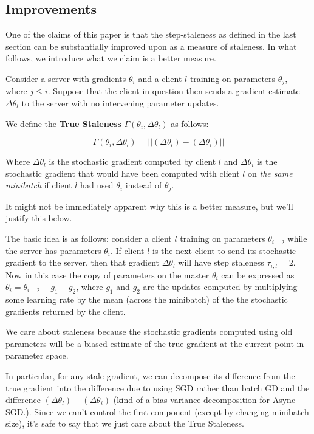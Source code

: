 \documentclass{article} %
\begin{document}
\subsection{Improvements}

One of the claims of this paper is that the step-staleness as defined in the last section
can be substantially improved upon as a measure of staleness.
In what follows, we introduce what we claim is a better measure. 

Consider a server with gradients $\theta_{i}$ and a client $l$ training on parameters $\theta_{j}$,
where $j \leq i$. Suppose that the client in question then sends a gradient estimate $\Delta \theta_l$
to the server with no intervening parameter updates.

We define the \textbf{True Staleness} $\Gamma(\theta_{i}, \Delta \theta_l)$ as follows:

$$ \Gamma(\theta_{i}, \Delta \theta_l) = || (\Delta \theta_l) - (\Delta \theta_i) || $$

Where $ \Delta \theta_l $ is the stochastic gradient computed by client $l$ and
$ \Delta \theta_i$ is the stochastic gradient that would have been computed with client
$l$ on \textit{the same minibatch} if client $l$ had used $\theta_i$ instead of $\theta_j$.

It might not be immediately apparent why this is a better measure, but we'll justify this below.

The basic idea is as follows: consider a client $l$ training on parameters $\theta_{i-2}$
while the server has parameters $\theta_{i}$.
If client $l$ is the next client to send its stochastic gradient to the server, then that
gradient $\Delta \theta_l$ will have step staleness $\tau_{i,l} = 2$.
Now in this case the copy of parameters on the master $\theta_i$ can be expressed as $\theta_i = \theta_{i-2} - g_1 - g_2$,
where $g_1$ and $g_2$ are the updates computed by multiplying some learning rate by the mean (across the minibatch) of
the the stochastic gradients returned by the client.

We care about staleness because the stochastic gradients computed using old parameters will be a biased estimate
of the true gradient at the current point in parameter space.

In particular, for any stale gradient, we can decompose its difference from the true gradient
into the difference due to using SGD rather than batch GD and the difference $(\Delta \theta_l) - (\Delta \theta_i)$
(kind of a bias-variance decomposition for Async SGD.).
Since we can't control the first component (except by changing minibatch size),
it's safe to say that we just care about the True Staleness.
\end{document}
